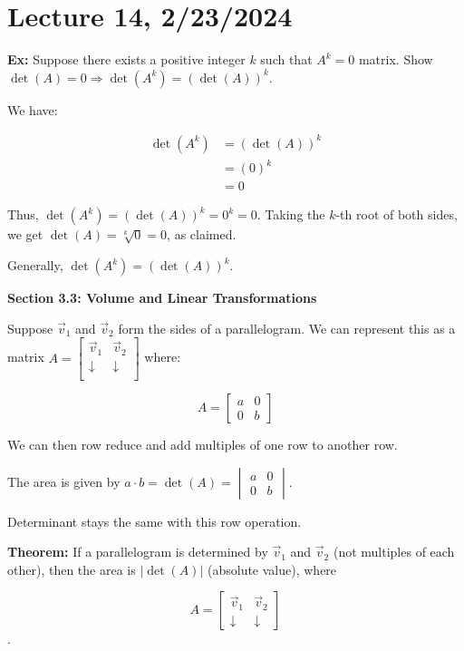 \documentclass{article}
\begin{document}
\section{Lecture 14, 2/23/2024}

\textbf{Ex:} Suppose there exists a positive integer \( k \) such that \( A^k = 0 \) matrix. Show \( \det(A) = 0 \Rightarrow \det(A^k) = (\det(A))^k \).

We have:

\[
\begin{aligned}
\det(A^k) &= (\det(A))^k \\
&= (0)^k \\
&= 0
\end{aligned}
\]

Thus, \( \det(A^k) = (\det(A))^k = 0^k = 0 \). Taking the \( k \)-th root of both sides, we get \( \det(A) = \sqrt[k]{0} = 0 \), as claimed.

Generally, \( \det(A^k) = (\det(A))^k \).

\medskip

\textbf{Section 3.3: Volume and Linear Transformations}

Suppose \( \vec{v}_1 \) and \( \vec{v}_2 \) form the sides of a parallelogram. We can represent this as a matrix \( A = \begin{bmatrix} 
\vec{v}_1 & \vec{v}_2 \\
\downarrow & \downarrow \\
\end{bmatrix} \) where:

\[
A = \begin{bmatrix} a & 0 \\ 0 & b \end{bmatrix}
\]

We can then row reduce and add multiples of one row to another row.

The area is given by \( a \cdot b = \det(A) = \begin{vmatrix} a & 0 \\ 0 & b \end{vmatrix} \).


Determinant stays the same with this row operation.


\textbf{Theorem:} If a parallelogram is determined by \( \vec{v}_1 \) and \( \vec{v}_2 \) (not multiples of each other), then the area is \( |\det(A)| \) (absolute value), where 

\[ A = \begin{bmatrix} \vec{v}_1 & \vec{v}_2 \\ \downarrow & \downarrow \end{bmatrix} \].
\end{document}
